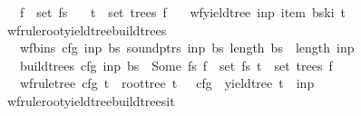 \begin{isabellebody}
\ \ \ {\isachardoublequoteopen}f\ {\isasymin}\ set\ fs{\isachardoublequoteclose}\isanewline
\ \ \ {\isachardoublequoteopen}t\ {\isasymin}\ set\ {\isacharparenleft}{\kern0pt}trees\ f{\isacharparenright}{\kern0pt}{\isachardoublequoteclose}\isanewline
\ \ \ {\isachardoublequoteopen}wf{\isacharunderscore}{\kern0pt}yield{\isacharunderscore}{\kern0pt}tree\ inp\ {\isacharparenleft}{\kern0pt}item\ {\isacharparenleft}{\kern0pt}bs{\isacharbang}{\kern0pt}k{\isacharbang}{\kern0pt}i{\isacharparenright}{\kern0pt}{\isacharparenright}{\kern0pt}\ t{\isachardoublequoteclose}%
\isadelimproof
%
\endisadelimproof
%
\isatagproof
%
\endisatagproof
{\isafoldproof}%
%
\isadelimproof
\isanewline
%
\endisadelimproof
{}\isamarkupfalse%
\ wf{\isacharunderscore}{\kern0pt}rule{\isacharunderscore}{\kern0pt}root{\isacharunderscore}{\kern0pt}yield{\isacharunderscore}{\kern0pt}tree{\isacharunderscore}{\kern0pt}build{\isacharunderscore}{\kern0pt}trees{\isacharcolon}{\kern0pt}\isanewline
\ \ \ {\isachardoublequoteopen}wf{\isacharunderscore}{\kern0pt}bins\ cfg\ inp\ bs{\isachardoublequoteclose}\ {\isachardoublequoteopen}sound{\isacharunderscore}{\kern0pt}ptrs\ inp\ bs{\isachardoublequoteclose}\ {\isachardoublequoteopen}length\ bs\ {\isacharequal}{\kern0pt}\ length\ inp\ {\isacharplus}{\kern0pt}\ {}{\isachardoublequoteclose}\isanewline
\ \ \ {\isachardoublequoteopen}build{\isacharunderscore}{\kern0pt}trees\ cfg\ inp\ bs\ {\isacharequal}{\kern0pt}\ Some\ fs{\isachardoublequoteclose}\ {\isachardoublequoteopen}f\ {\isasymin}\ set\ fs{\isachardoublequoteclose}\ {\isachardoublequoteopen}t\ {\isasymin}\ set\ {\isacharparenleft}{\kern0pt}trees\ f{\isacharparenright}{\kern0pt}{\isachardoublequoteclose}\isanewline
\ \ \ {\isachardoublequoteopen}wf{\isacharunderscore}{\kern0pt}rule{\isacharunderscore}{\kern0pt}tree\ cfg\ t\ {\isasymand}\ root{\isacharunderscore}{\kern0pt}tree\ t\ {\isacharequal}{\kern0pt}\ {\isasymSS}\ cfg\ {\isasymand}\ yield{\isacharunderscore}{\kern0pt}tree\ t\ {\isacharequal}{\kern0pt}\ inp{\isachardoublequoteclose}%
\isadelimproof
%
\endisadelimproof
%
\isatagproof
%
\endisatagproof
{\isafoldproof}%
%
\isadelimproof
\isanewline
%
\endisadelimproof
{}\isamarkupfalse%
\ wf{\isacharunderscore}{\kern0pt}rule{\isacharunderscore}{\kern0pt}root{\isacharunderscore}{\kern0pt}yield{\isacharunderscore}{\kern0pt}tree{\isacharunderscore}{\kern0pt}build{\isacharunderscore}{\kern0pt}trees{\isacharunderscore}{\kern0pt}{\isasymII}{\isacharunderscore}{\kern0pt}it{\isacharcolon}{\kern0pt}\isanewline

\end{isabellebody}
